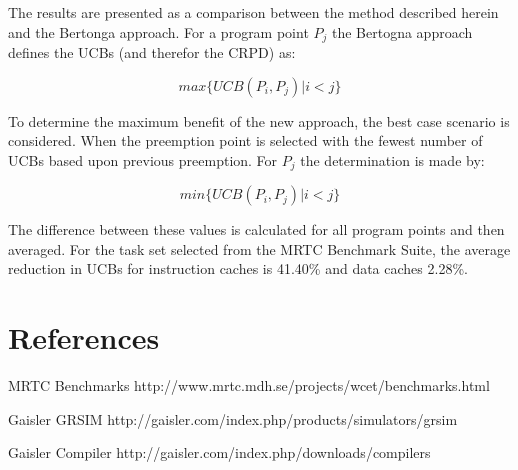 \documentclass[12pt]{article}
\begin{document}
The results are presented as a comparison between the method described
herein and the Bertonga approach. For a program point ${P_j}$ the
Bertogna approach defines the UCBs (and therefor the CRPD) as:

\begin{equation*}
  max\{ UCB(P_i, P_j) \vert i < j \}
\end{equation*}

To determine the maximum benefit of the new approach, the best case
scenario is considered. When the preemption point is selected with the
fewest number of UCBs based upon previous preemption.  For ${P_j}$ the
determination is made by:

\begin{equation*}
  min\{ UCB(P_i, P_j) \vert i < j \}
\end{equation*}

The difference between these values is calculated for all program
points and then averaged. For the task set selected from the MRTC
Benchmark Suite, the average reduction in UCBs for instruction caches
is 41.40\% and data caches 2.28\%.

\section{References}

MRTC Benchmarks 
http://www.mrtc.mdh.se/projects/wcet/benchmarks.html


Gaisler GRSIM 
http://gaisler.com/index.php/products/simulators/grsim


Gaisler Compiler 
http://gaisler.com/index.php/downloads/compilers
\end{document}
